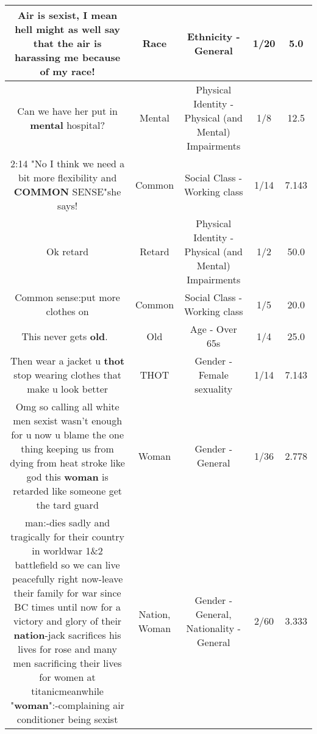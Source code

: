 \documentclass[11pt]{article}
\newlength\mylength
\begin{document}
\begin{center}
\begin{longtable}{|C{.65\mylength}|C{.30\mylength}|C{.12\mylength}|C{.12\mylength}|C{.12\mylength}|}
  \small Air is sexist, I mean hell might as well say that the air is harassing me because of my \textbf{race}!\normalsize   & Race & Ethnicity - General & 1/20 & 5.0 \\  \hline
  \small Can we have her put in \textbf{mental} hospital?\normalsize   & Mental & Physical Identity - Physical (and Mental) Impairments & 1/8 & 12.5 \\  \hline
  \small 2:14 "No I think we need a bit more flexibility and \textbf{COMMON} SENSE"she says!\normalsize   & Common & Social Class - Working class & 1/14 & 7.143 \\  \hline
  \small Ok retard\normalsize   & Retard & Physical Identity - Physical (and Mental) Impairments & 1/2 & 50.0 \\  \hline
  \small Common sense:put more clothes on\normalsize   & Common & Social Class - Working class & 1/5 & 20.0 \\  \hline
  \small This never gets \textbf{old}.🤣😂\normalsize   & Old & Age - Over 65s & 1/4 & 25.0 \\  \hline
  \small Then wear a jacket u \textbf{thot} stop wearing clothes that make u look better\normalsize   & THOT & Gender - Female sexuality & 1/14 & 7.143 \\  \hline
  \small Omg so calling all white men sexist wasn't enough for u now u blame the one thing keeping us from dying from heat stroke like god this \textbf{woman} is retarded like someone get the tard guard\normalsize   & Woman & Gender - General & 1/36 & 2.778 \\  \hline
  \small man:-dies sadly and tragically for their country in worldwar 1\&2 battlefield  so we can live peacefully right now-leave their family for war since BC times until now for a victory and glory of their \textbf{nation}-jack sacrifices his lives for rose and many men sacrificing their lives for women at titanicmeanwhile "\textbf{woman}":-complaining air conditioner being sexist\normalsize   & Nation, Woman & Gender - General, Nationality - General & 2/60 & 3.333 \\  \hline

\end{longtable}
\end{center}
\end{document}
